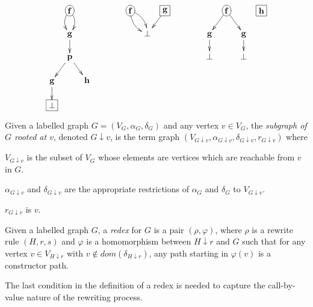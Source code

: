 \documentclass{LMCS}
\newcommand{\funone}{\mathbf{f}}
\newcommand{\funtwo}{\mathbf{g}}
\newcommand{\funthree}{\mathbf{h}}
\newcommand{\funfour}{\mathbf{p}}
\newcommand{\vsone}{V}
\newcommand{\ordone}{\alpha}
\newcommand{\labelone}{\delta}
\newcommand{\rootone}{r}
\newcommand{\roottwo}{s}
\newcommand{\verone}{v}
\newcommand{\tgone}{G}
\newcommand{\tgtwo}{H}
\newcommand{\rrone}{\rho}
\newcommand{\homone}{\varphi}
\newcommand{\domain}[1]{\mathit{dom}(#1)}
\newcommand{\subgr}[2]{#1\downarrow #2}
\newenvironment{varitemize}
{
\begin{list}{\labelitemi}
{\setlength{\itemsep}{0.0mm}
 \setlength{\topsep}{0.0mm}
 \setlength{\parindent}{0.0mm}
 \setlength{\parskip}{0.0mm}
 \setlength{\parsep}{0.0mm}
 \setlength{\partopsep}{0.0mm}
 \setlength{\leftmargin}{15pt}
 \setlength{\labelsep}{5pt}
 \setlength{\labelwidth}{10pt}}}
{
 \end{list} 
}
\begin{document}
\begin{displaymath}
\xymatrix@R=15pt@C=8pt{
     &  *+[o][F]{\funone} \ar@/_/[d]\ar@/^/[d] &   \\
     & \funtwo \ar[d] &   \\
     & \funfour \ar[dl]\ar[dr] &   \\
\funtwo \ar[d] &          & \funthree \\
*+[F]{\bot} &          &   \\
}
\hspace{40pt}
\xymatrix@R=15pt@C=8pt{
 *+[o][F]{\funone}\ar@/^/[dr]\ar@/_/[dr] & &  *+[F]{\funtwo} \ar[dl]\\
          & \bot &                         \\
}
\hspace{40pt}
\xymatrix@R=15pt@C=8pt{
        & *+[o][F]{\funone}\ar[dl]\ar[dr] &  &  *+[F]{\funthree}\\
\funtwo\ar[d] &                  & \funtwo\ar[d] &   \\
\bot    &                  & \bot    &   \\
}
\end{displaymath}
\begin{defi}[Subgraph]
Given a labelled graph $\tgone=(\vsone_\tgone,\ordone_\tgone,\labelone_\tgone)$ 
and any vertex $\verone\in\vsone_\tgone$, the \emph{subgraph of $\tgone$ rooted
at $\verone$}, denoted $\subgr{\tgone}{\verone}$, is the
term graph $(\vsone_{\subgr{\tgone}{\verone}},\ordone_{\subgr{\tgone}{\verone}},\labelone_{\subgr{\tgone}{\verone}},
\rootone_{\subgr{\tgone}{\verone}})$ where
\begin{varitemize}
\item
  $\vsone_{\subgr{\tgone}{\verone}}$ is the subset of $\vsone_\tgone$ whose elements
  are vertices which are reachable from $\verone$ in $\tgone$.
\item
  $\ordone_{\subgr{\tgone}{\verone}}$ and $\labelone_{\subgr{\tgone}{\verone}}$ are
  the appropriate restrictions of $\ordone_\tgone$ and $\labelone_\tgone$
  to $\vsone_{\subgr{\tgone}{\verone}}$.
\item
  $\rootone_{\subgr{\tgone}{\verone}}$ is $\verone$.
\end{varitemize}
\end{defi}
\begin{defi}[Redex]
Given a labelled graph $\tgone$, a \emph{redex} for $\tgone$ is
a pair $(\rrone,\homone)$, where $\rrone$ is a rewrite rule 
$(\tgtwo,\rootone,\roottwo)$ and $\homone$ is a homomorphism
between $\subgr{\tgtwo}{\rootone}$ and $\tgone$
such that for any vertex $\verone\in\vsone_{\subgr{\tgtwo}{\rootone}}$
with $\verone\notin\domain{\labelone_{\subgr{\tgtwo}{\rootone}}}$, 
any path starting in $\homone(\verone)$ is a constructor path.
\end{defi}
The last condition in the definition of a redex is needed to
capture the call-by-value nature of the rewriting process.
\end{document}
